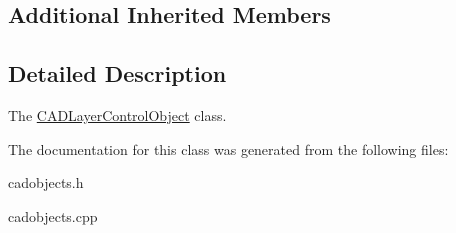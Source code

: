 \subsection*{Additional Inherited Members}


\subsection{Detailed Description}
The \hyperlink{class_c_a_d_layer_control_object}{C\+A\+D\+Layer\+Control\+Object} class. 

The documentation for this class was generated from the following files\+:\begin{DoxyCompactItemize}
\item 
cadobjects.\+h\item 
cadobjects.\+cpp\end{DoxyCompactItemize}

